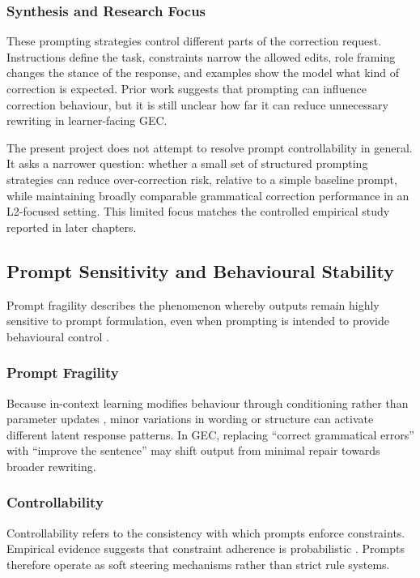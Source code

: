 \subsubsection*{Synthesis and Research Focus}

These prompting strategies control different parts of the correction request. Instructions define the task, constraints narrow the allowed edits, role framing changes the stance of the response, and examples show the model what kind of correction is expected. Prior work suggests that prompting can influence correction behaviour, but it is still unclear how far it can reduce unnecessary rewriting in learner-facing GEC.

The present project does not attempt to resolve prompt controllability in general. It asks a narrower question: whether a small set of structured prompting strategies can reduce over-correction risk, relative to a simple baseline prompt, while maintaining broadly comparable grammatical correction performance in an L2-focused setting. This limited focus matches the controlled empirical study reported in later chapters.

\subsection{Prompt Sensitivity and Behavioural Stability}

Prompt fragility describes the phenomenon whereby outputs remain highly sensitive to prompt formulation, even when prompting is intended to provide behavioural control \cite{liu2023pretrain}.

\subsubsection{Prompt Fragility}

Because in-context learning modifies behaviour through conditioning rather than parameter updates \cite{NEURIPS2020_1457c0d6}, minor variations in wording or structure can activate different latent response patterns. In GEC, replacing ``correct grammatical errors'' with ``improve the sentence'' may shift output from minimal repair towards broader rewriting.

\subsubsection{Controllability}

Controllability refers to the consistency with which prompts enforce constraints. Empirical evidence suggests that constraint adherence is probabilistic \cite{wei2022finetuned,liu2023pretrain}. Prompts therefore operate as soft steering mechanisms rather than strict rule systems.

